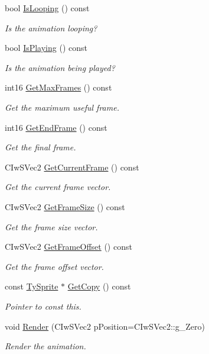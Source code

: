 \begin{DoxyCompactItemize}
bool \hyperlink{class_ty_sprite_aa06bdb518fe6a6c74f140ac586676c90}{IsLooping} () const 
\begin{DoxyCompactList}\small\item\em Is the animation looping? \end{DoxyCompactList}\item 
bool \hyperlink{class_ty_sprite_aabfd261004391004e192caf3ca86ea1f}{IsPlaying} () const 
\begin{DoxyCompactList}\small\item\em Is the animation being played? \end{DoxyCompactList}\item 
int16 \hyperlink{class_ty_sprite_a03e21ca46dc3b68c52f42b346a892972}{GetMaxFrames} () const 
\begin{DoxyCompactList}\small\item\em Get the maximum useful frame. \end{DoxyCompactList}\item 
int16 \hyperlink{class_ty_sprite_a15f4d268bb5425d316def146100f55dd}{GetEndFrame} () const 
\begin{DoxyCompactList}\small\item\em Get the final frame. \end{DoxyCompactList}\item 
CIwSVec2 \hyperlink{class_ty_sprite_a1aa77611cfa54a81f4da4a030004a96b}{GetCurrentFrame} () const 
\begin{DoxyCompactList}\small\item\em Get the current frame vector. \end{DoxyCompactList}\item 
CIwSVec2 \hyperlink{class_ty_sprite_aaa956decc12cde4489a665306dafd56d}{GetFrameSize} () const 
\begin{DoxyCompactList}\small\item\em Get the frame size vector. \end{DoxyCompactList}\item 
CIwSVec2 \hyperlink{class_ty_sprite_abb95b562872c1b2fe89c5d75e582b5f0}{GetFrameOffset} () const 
\begin{DoxyCompactList}\small\item\em Get the frame offset vector. \end{DoxyCompactList}\item 
const \hyperlink{class_ty_sprite}{TySprite} $\ast$ \hyperlink{class_ty_sprite_a24045a705e395924b61e0cae50efe893}{GetCopy} () const 
\begin{DoxyCompactList}\small\item\em Pointer to const this. \end{DoxyCompactList}\item 
void \hyperlink{class_ty_sprite_aa1e6e85ccf29eeb74a93768efb5695cd}{Render} (CIwSVec2 pPosition=CIwSVec2::g\_\-Zero)
\begin{DoxyCompactList}\small\item\em Render the animation. \end{DoxyCompactList}\end{DoxyCompactItemize}


